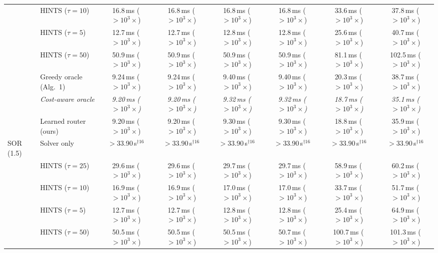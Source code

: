 {\begin{tabular}{llcccccc}
 & HINTS ($\tau{=}10$) & 16.8\,ms ($>10^{3}\times$) & 16.8\,ms ($>10^{3}\times$) & 16.8\,ms ($>10^{3}\times$) & 16.8\,ms ($>10^{3}\times$) & 33.6\,ms ($>10^{3}\times$) & 37.8\,ms ($>10^{3}\times$) \\
 & HINTS ($\tau{=}5$) & 12.7\,ms ($>10^{3}\times$) & 12.7\,ms ($>10^{3}\times$) & 12.8\,ms ($>10^{3}\times$) & 12.8\,ms ($>10^{3}\times$) & 25.6\,ms ($>10^{3}\times$) & 40.7\,ms ($>10^{3}\times$) \\
 & HINTS ($\tau{=}50$) & 50.9\,ms ($>10^{3}\times$) & 50.9\,ms ($>10^{3}\times$) & 50.9\,ms ($>10^{3}\times$) & 50.9\,ms ($>10^{3}\times$) & 81.1\,ms ($>10^{3}\times$) & 102.5\,ms ($>10^{3}\times$) \\
 & Greedy oracle (Alg.~1) & 9.24\,ms ($>10^{3}\times$) & 9.24\,ms ($>10^{3}\times$) & 9.40\,ms ($>10^{3}\times$) & 9.40\,ms ($>10^{3}\times$) & 20.3\,ms ($>10^{3}\times$) & 38.7\,ms ($>10^{3}\times$) \\
 & \textit{Cost-aware oracle} & \textit{9.20\,ms ($>10^{3}\times$)} & \textit{9.20\,ms ($>10^{3}\times$)} & \textit{9.32\,ms ($>10^{3}\times$)} & \textit{9.32\,ms ($>10^{3}\times$)} & \textit{18.7\,ms ($>10^{3}\times$)} & \textit{35.1\,ms ($>10^{3}\times$)} \\
 & Learned router (ours) & 9.20\,ms ($>10^{3}\times$) & 9.20\,ms ($>10^{3}\times$) & 9.30\,ms ($>10^{3}\times$) & 9.30\,ms ($>10^{3}\times$) & 18.8\,ms ($>10^{3}\times$) & 35.9\,ms ($>10^{3}\times$) \\
\midrule
SOR (1.5) & Solver only & $>$33.90\,s$^{\dagger 16}$ & $>$33.90\,s$^{\dagger 16}$ & $>$33.90\,s$^{\dagger 16}$ & $>$33.90\,s$^{\dagger 16}$ & $>$33.90\,s$^{\dagger 16}$ & $>$33.90\,s$^{\dagger 16}$ \\
 & HINTS ($\tau{=}25$) & 29.6\,ms ($>10^{3}\times$) & 29.6\,ms ($>10^{3}\times$) & 29.7\,ms ($>10^{3}\times$) & 29.7\,ms ($>10^{3}\times$) & 58.9\,ms ($>10^{3}\times$) & 60.2\,ms ($>10^{3}\times$) \\
 & HINTS ($\tau{=}10$) & 16.9\,ms ($>10^{3}\times$) & 16.9\,ms ($>10^{3}\times$) & 17.0\,ms ($>10^{3}\times$) & 17.0\,ms ($>10^{3}\times$) & 33.7\,ms ($>10^{3}\times$) & 51.7\,ms ($>10^{3}\times$) \\
 & HINTS ($\tau{=}5$) & 12.7\,ms ($>10^{3}\times$) & 12.7\,ms ($>10^{3}\times$) & 12.8\,ms ($>10^{3}\times$) & 12.8\,ms ($>10^{3}\times$) & 25.4\,ms ($>10^{3}\times$) & 64.9\,ms ($>10^{3}\times$) \\
 & HINTS ($\tau{=}50$) & 50.5\,ms ($>10^{3}\times$) & 50.5\,ms ($>10^{3}\times$) & 50.5\,ms ($>10^{3}\times$) & 50.7\,ms ($>10^{3}\times$) & 100.7\,ms ($>10^{3}\times$) & 101.3\,ms ($>10^{3}\times$) \\

\end{tabular}}
